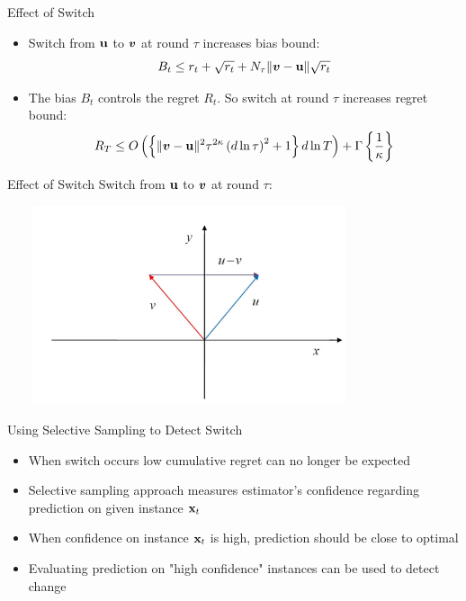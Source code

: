 \documentclass{beamer}
\begin{document}
\begin{frame}{Effect of Switch}
\begin{itemize}
\item Switch from $\mathbf{u}$ to ${\boldsymbol{v}}$ at round $\tau$ increases bias bound:\newline
\newline
\begin{equation*}
B_t\leq r_t+\sqrt{r_t}+N_{\tau}\|{\boldsymbol{v}}-\mathbf{u}\|\sqrt{r_t}
\end{equation*}\newline
\item The bias $B_t$ controls the regret $R_t$. So switch at round $\tau$ increases regret bound:\newline\newline
\begin{equation*}
 R_T\leq O\left(\left\{\|{\boldsymbol{v}}-\mathbf{u}\|^2{\tau}^{2\kappa}\left(d\ln{\tau}\right)^2+1\right\}d\ln{T}\right)+\Gamma\left\{\frac{1}{\kappa}\right\}
\end{equation*}
\end{itemize}
\end{frame}

\begin{frame}{Effect of Switch}
Switch from $\mathbf{u}$ to ${\boldsymbol{v}}$ at round $\tau$:
\begin{center}
\includegraphics[height=2.3in,width=4.2in]{switch_vecs.jpg}
\end{center}
\end{frame}


\begin{frame}{Using Selective Sampling to Detect Switch}
\begin{itemize}
\item When switch occurs low cumulative regret can no longer be expected \newline
\item Selective sampling approach measures estimator's confidence regarding prediction on given instance $\mathbf{x}_{t}$ \newline
\item When confidence on instance $\mathbf{x}_{t}$ is high, prediction should be close to optimal \newline
\item Evaluating prediction on "high confidence" instances can be used to detect change \newline
\end{itemize}


\end{frame}
\end{document}
